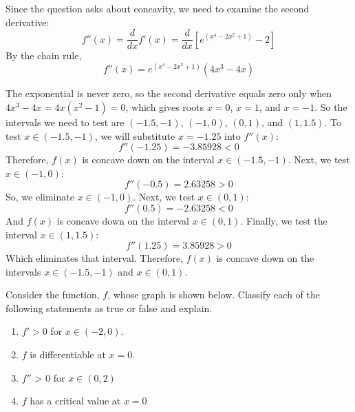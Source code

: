 \begin{Answer}[ref = concavity3]
Since the question asks about concavity, we need to examine the second derivative:
$$f''(x) = \frac{d}{dx} f'(x) = \frac{d}{dx} \left[ e^{(x^4 - 2x^2 + 1)} - 2 
\right]$$
By the chain rule,
$$f''(x) = e^{(x^4 - 2x^2 + 1)} \left(4x^3 - 4x \right)$$

The exponential is never zero, so the second derivative equals zero only when
$4x^3 - 4x = 4x(x^2-1) = 0$, which gives roots $x = 0$, $x = 1$, and $x = 
-1$. So the intervals we need to test are $(-1.5, -1)$, $(-1, 0)$, $(0, 1)$, 
and $(1, 1.5)$. To test $x \in (-1.5, -1)$, we will substitute $x = -1.25$ 
into $f''(x)$:
$$f''(-1.25) = -3.85928 < 0$$
Therefore, $f(x)$ is concave down on the interval $x \in (-1.5, -1)$. 
Next, we test $x \in (-1, 0)$:
$$f''(-0.5) = 2.63258 > 0$$
So, we eliminate $x \in (-1, 0)$. Next, we test $x \in (0, 1)$:
$$f''(0.5) = -2.63258 < 0$$
And $f(x)$ is concave down on the interval $x \in (0, 1)$. Finally, we test 
the interval $x \in (1, 1.5)$:
$$f''(1.25) = 3.85928 > 0$$
Which eliminates that interval. Therefore, $f(x)$ is concave down on the 
intervals $x \in (-1.5, -1)$ and $x \in (0, 1)$. 
\end{Answer}

\begin{Exercise} Consider the 
function, $f$, whose graph is shown below. Classify each of the following 
statements as true or false and explain. 
\begin{enumerate}
\item $f' > 0$ for $x \in (-2, 0)$.
\item $f$ is differentiable at $x = 0$.
\item $f''$ > 0 for $x \in (0, 2)$
\item $f$ has a critical value at $x = 0$
\end{enumerate}
\end{Exercise}

